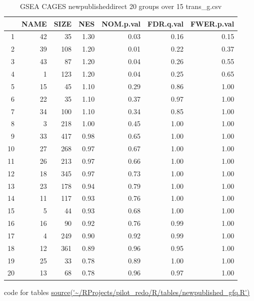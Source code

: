 \begin{table}[ht]
\centering
\begin{tabular}{rrrrrrr}
  \hline
 & NAME & SIZE & NES & NOM.p.val & FDR.q.val & FWER.p.val \\ 
  \hline
1 &  42 &  35 & 1.30 & 0.03 & 0.16 & 0.15 \\ 
  2 &  39 & 108 & 1.20 & 0.01 & 0.22 & 0.37 \\ 
  3 &  43 &  87 & 1.20 & 0.04 & 0.26 & 0.55 \\ 
  4 &   1 & 123 & 1.20 & 0.04 & 0.25 & 0.65 \\ 
  5 &  15 &  45 & 1.10 & 0.29 & 0.86 & 1.00 \\ 
  6 &  22 &  35 & 1.10 & 0.37 & 0.97 & 1.00 \\ 
  7 &  34 & 100 & 1.10 & 0.34 & 0.85 & 1.00 \\ 
  8 &   3 & 218 & 1.00 & 0.45 & 1.00 & 1.00 \\ 
  9 &  33 & 417 & 0.98 & 0.65 & 1.00 & 1.00 \\ 
  10 &  27 & 268 & 0.97 & 0.67 & 1.00 & 1.00 \\ 
  11 &  26 & 213 & 0.97 & 0.66 & 1.00 & 1.00 \\ 
  12 &  18 & 345 & 0.97 & 0.73 & 1.00 & 1.00 \\ 
  13 &  23 & 178 & 0.94 & 0.79 & 1.00 & 1.00 \\ 
  14 &  11 & 117 & 0.93 & 0.76 & 1.00 & 1.00 \\ 
  15 &   5 &  44 & 0.93 & 0.68 & 1.00 & 1.00 \\ 
  16 &  16 &  90 & 0.92 & 0.76 & 0.99 & 1.00 \\ 
  17 &   4 & 249 & 0.90 & 0.92 & 0.99 & 1.00 \\ 
  18 &  12 & 361 & 0.89 & 0.96 & 0.95 & 1.00 \\ 
  19 &  25 &  33 & 0.78 & 0.89 & 1.00 & 1.00 \\ 
  20 &  13 &  68 & 0.78 & 0.96 & 0.97 & 1.00 \\ 
   \hline
\end{tabular}
\caption{GSEA CAGES newpublisheddirect 20 groups over 15 trans\_g.csv} 
\label{tab:trans_g.csv new published direct}
\end{table}

code for tables \url{source('~/RProjects/pilot_redo/R/tables/newpublished_gfq.R')}

